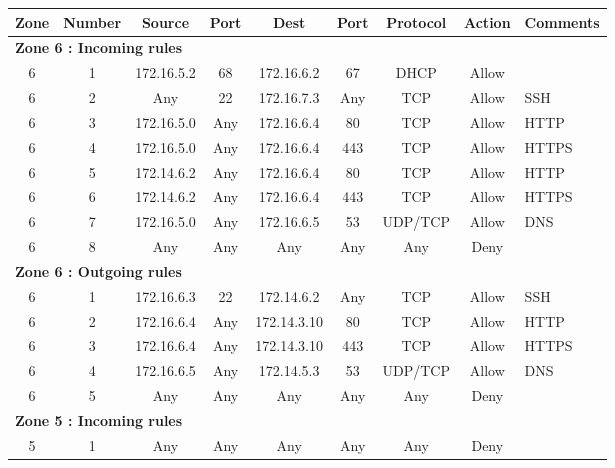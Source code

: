 \documentclass[a4paper,titlepage]{article}
\begin{document}
\begin{table}[h]
	\center
	\begin{tabular}{c|c|cc|cc|ccl}
		Zone & Number & Source & Port & Dest & Port & Protocol & Action & \multicolumn{1}{c}{Comments}\\
		\hline
		\multicolumn{9}{l}{\textbf{Zone 6 : Incoming rules}}\\
		6 & 1 & 172.16.5.2 & 68 & 172.16.6.2 & 67 & DHCP & Allow & \\
		6 & 2 & Any & 22 & 172.16.7.3 & Any & TCP & Allow & SSH \\
		6 & 3 & 172.16.5.0 & Any & 172.16.6.4 & 80 & TCP & Allow & HTTP \\
		6 & 4 & 172.16.5.0 & Any & 172.16.6.4 & 443 & TCP & Allow & HTTPS \\
		6 & 5 & 172.14.6.2 & Any & 172.16.6.4 & 80 & TCP & Allow & HTTP \\
		6 & 6 & 172.14.6.2 & Any & 172.16.6.4 & 443 & TCP & Allow & HTTPS \\
		6 & 7 & 172.16.5.0 & Any & 172.16.6.5 & 53 & UDP/TCP & Allow & DNS \\
		6 & 8 & Any & Any & Any & Any & Any & Deny & \\
		
		\hline
		\multicolumn{9}{l}{\textbf{Zone 6 : Outgoing rules}}\\
		6 & 1 & 172.16.6.3 & 22 & 172.14.6.2 & Any & TCP & Allow & SSH\\
		6 & 2 & 172.16.6.4 & Any & 172.14.3.10 & 80 & TCP & Allow & HTTP\\
		6 & 3 & 172.16.6.4 & Any & 172.14.3.10 & 443 & TCP & Allow & HTTPS\\
		6 & 4 & 172.16.6.5 & Any & 172.14.5.3 & 53 & UDP/TCP & Allow & DNS \\
		6 & 5 & Any & Any & Any & Any & Any & Deny & \\
		\hline
		\multicolumn{9}{l}{\textbf{Zone 5 : Incoming rules}}\\
		5 & 1 & Any & Any & Any & Any & Any & Deny & \\


\end{tabular}
\end{table}
\end{document}
